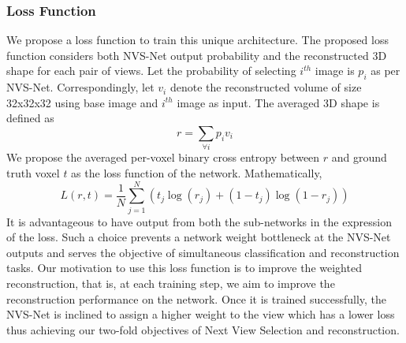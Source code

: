 \subsubsection{Loss Function}
We propose a loss function to train this unique architecture. The proposed loss function considers both NVS-Net output probability and the reconstructed 3D shape for each pair of views. Let the probability of selecting $i^{th}$ image is $p_i$ as per NVS-Net. Correspondingly, let $v_i$ denote the reconstructed volume of size 32x32x32 using base image and $i^{th}$ image as input. The averaged 3D shape is defined as 
\begin{equation}
    r = \sum_{\forall i} p_i v_i
\end{equation}
We propose the averaged per-voxel binary cross entropy between $r$ and ground truth voxel $t$ as the loss function of the network. Mathematically,
\begin{equation}
    L(r, t) = \frac{1}{N} \sum_{j=1}^{N} (t_j\log(r_j) + (1-t_j)\log(1-r_j))
\end{equation}
It is advantageous to have output from both the sub-networks in the expression of the loss. Such a choice prevents a network weight bottleneck at the NVS-Net outputs and serves the objective of simultaneous classification and reconstruction tasks. Our motivation to use this loss function is to improve the weighted reconstruction, that is, at each training step, we aim to improve the reconstruction performance on the network. Once it is trained successfully, the NVS-Net is inclined to assign a higher weight to the view which has a lower loss thus achieving our two-fold objectives of Next View Selection and reconstruction.
